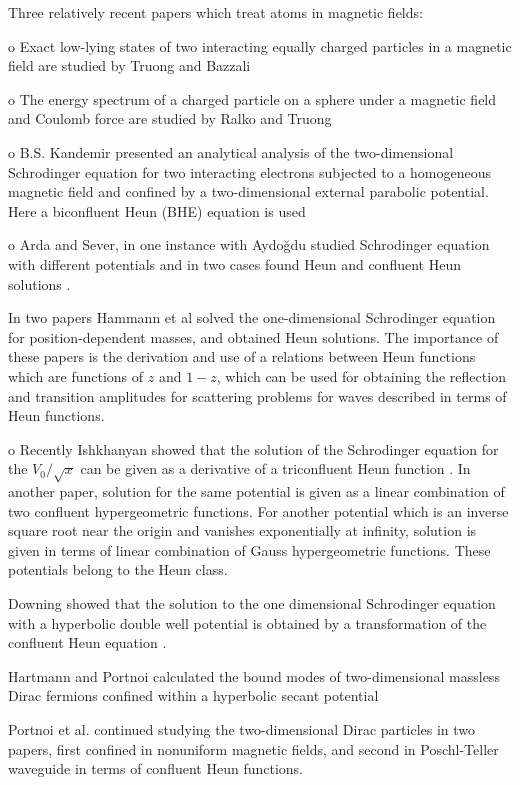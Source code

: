 \documentclass{article}
\begin{document}
\noindent Three relatively recent papers which treat atoms in
magnetic fields:


o Exact low-lying states of two interacting equally charged
particles in a magnetic field are studied  by Truong and Bazzali
\cite{Truong1}


o The energy spectrum of a charged particle on a sphere under a
magnetic field and Coulomb force are studied by Ralko and Truong
\cite{Truong2}


o B.S. Kandemir presented an analytical analysis of the
two-dimensional Schrodinger equation for two interacting electrons
subjected to a homogeneous magnetic field and confined by a
two-dimensional external parabolic potential. Here a biconfluent
Heun (BHE) equation is used \cite{Kandemir}

o Arda and Sever, in one instance with Aydo\u{g}du studied
Schrodinger equation with different potentials and in two cases
found Heun and confluent Heun solutions \cite{Arda1, Arda2}.

In two papers Hammann et al \cite{Hammann1,Hammann2} solved the one-dimensional Schrodinger equation for position-dependent masses, and obtained  Heun solutions. The importance of these papers is the derivation and use of a relations between Heun functions which are functions of $z$ and $1-z$, which can be used for obtaining the reflection and transition amplitudes for scattering problems for waves  described in terms of Heun functions.

o Recently Ishkhanyan showed that the solution of the Schrodinger
equation for the $ V_0 / \sqrt{x} $ can be given as a derivative
of a triconfluent Heun function \cite{Artur}. In another paper, solution for the same potential  is given \cite{Artur2} as a linear combination of two confluent hypergeometric functions. For another potential which is an inverse square root near the origin and vanishes exponentially at infinity, solution is given in terms of linear combination of Gauss hypergeometric functions\cite{Artur3}. These potentials belong to the Heun class.

Downing showed that the solution to the one dimensional Schrodinger equation with a hyperbolic  double well potential is obtained by a transformation of the confluent Heun equation \cite{Downing}.

Hartmann and Portnoi calculated the bound modes of two-dimensional massless Dirac fermions confined within a hyperbolic secant potential \cite{Hartmann} 

Portnoi et al. continued studying the two-dimensional Dirac particles in two papers,  first confined in nonuniform magnetic fields, and second in Poschl-Teller waveguide\cite{Portnoi1, Portnoi2} in terms of confluent Heun functions.
\end{document}
